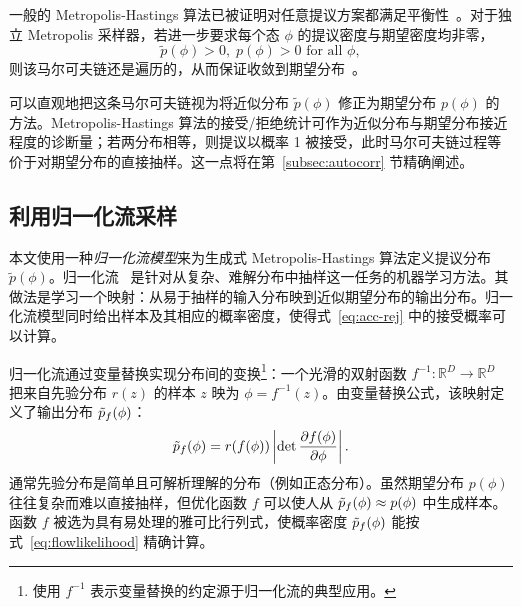 一般的 Metropolis-Hastings 算法已被证明对任意提议方案都满足平衡性~\cite{hastings70}。对于独立 Metropolis 采样器，若进一步要求每个态 $\phi$ 的提议密度与期望密度均非零，
%
\begin{equation}
    \tilde{p}(\phi) > 0, \; p(\phi) > 0 \text{ for all } \phi,
\end{equation}
%
则该马尔可夫链还是遍历的，从而保证收敛到期望分布~\cite{tierney1994}。

可以直观地把这条马尔可夫链视为将近似分布 $\tilde{p}(\phi)$ 修正为期望分布 $p(\phi)$ 的方法。Metropolis-Hastings 算法的接受/拒绝统计可作为近似分布与期望分布接近程度的诊断量；若两分布相等，则提议以概率 1 被接受，此时马尔可夫链过程等价于对期望分布的直接抽样。这一点将在第~\ref{subsec:autocorr} 节精确阐述。


\subsection{利用归一化流采样}
\label{subsec:normalizing-flows}
本文使用一种{\it 归一化流模型}来为生成式 Metropolis-Hastings 算法定义提议分布 $\tilde{p}(\phi)$。归一化流~\cite{rezende2015nf} 是针对从复杂、难解分布中抽样这一任务的机器学习方法。其做法是学习一个映射：从易于抽样的输入分布映到近似期望分布的输出分布。归一化流模型同时给出样本及其相应的概率密度，使得式~\eqref{eq:acc-rej} 中的接受概率可以计算。

归一化流通过变量替换实现分布间的变换\footnote{使用 $f^{-1}$ 表示变量替换的约定源于归一化流的典型应用。}：一个光滑的双射函数 $f^{-1}: \mathbb{R}^D \rightarrow \mathbb{R}^D$ 把来自先验分布 $r(z)$ 的样本 $z$ 映为 $\phi = f^{-1}(z)$。由变量替换公式，该映射定义了输出分布 $\tilde{p}_f(\phi)$：
\begin{align}
\label{eq:flowlikelihood}
\tilde{p}_f(\phi) = r(f(\phi))\left| \det  \frac{\partial f(\phi)}{\partial \phi} \right|.
\end{align}
通常先验分布是简单且可解析理解的分布（例如正态分布）。虽然期望分布 $p(\phi)$ 往往复杂而难以直接抽样，但优化函数 $f$ 可以使人从 $\tilde{p}_f(\phi) \approx p(\phi)$ 中生成样本。函数 $f$ 被选为具有易处理的雅可比行列式，使概率密度 $\tilde{p}_f(\phi)$ 能按式~\eqref{eq:flowlikelihood} 精确计算。
%




